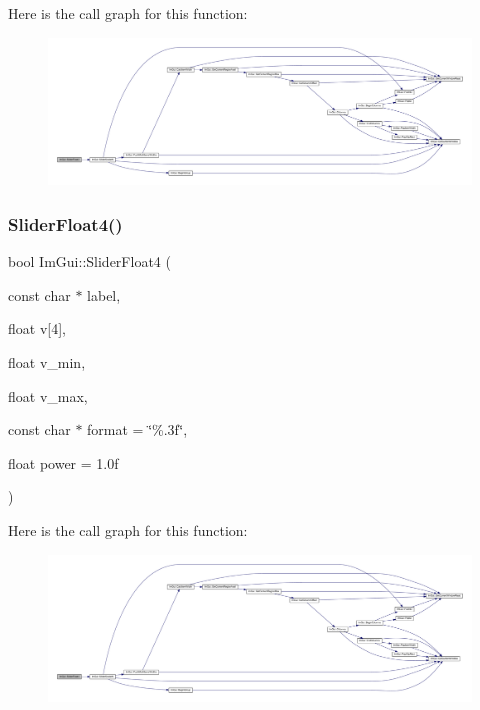 Here is the call graph for this function\+:
\nopagebreak
\begin{figure}[H]
\begin{center}
\leavevmode
\includegraphics[width=350pt]{namespace_im_gui_a946f179f439f8b94a2c4145d8050d5af_cgraph}
\end{center}
\end{figure}
\mbox{\label{namespace_im_gui_a87b3572fa26313a1d3fc5f755e6b7dbb}} 
\subsubsection{\texorpdfstring{Slider\+Float4()}{SliderFloat4()}}
{\footnotesize\ttfamily bool Im\+Gui\+::\+Slider\+Float4 (\begin{DoxyParamCaption}\item[{const char $\ast$}]{label,  }\item[{float}]{v\mbox{[}4\mbox{]},  }\item[{float}]{v\+\_\+min,  }\item[{float}]{v\+\_\+max,  }\item[{const char $\ast$}]{format = {\ttfamily \char`\"{}\%.3f\char`\"{}},  }\item[{float}]{power = {\ttfamily 1.0f} }\end{DoxyParamCaption})}

Here is the call graph for this function\+:
\nopagebreak
\begin{figure}[H]
\begin{center}
\leavevmode
\includegraphics[width=350pt]{namespace_im_gui_a87b3572fa26313a1d3fc5f755e6b7dbb_cgraph}
\end{center}
\end{figure}
\mbox{\label{namespace_im_gui_a2a78a45bfc70a98c7894bc8e75c53e4b}} 
